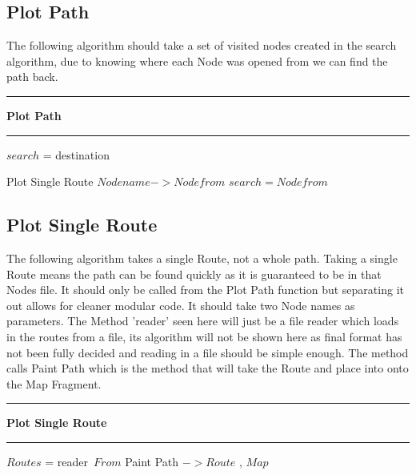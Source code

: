 \documentclass[10pt,a4paper]{article}
\begin{document}
\subsection{Plot Path}
The following algorithm should take a set of visited nodes created in the search algorithm, due to knowing where each Node was opened from we can find the path back.
\vspace{0.3cm}
\hrule
\vspace{0.1cm}
\textbf{Plot Path}
\vspace{0.1cm}
\hrule
\vspace{0.1cm}
\begin{algorithmic}[1]
\State$search$ = destination
	
		\State Plot Single Route $Node name -> Node from$
		\State $search = Node from$
	\EndIf
\EndFor
\EndFor
\end{algorithmic}
\newpage
\subsection{Plot Single Route}
The following algorithm takes a single Route, not a whole path. Taking a single Route means the path can be found quickly as it is guaranteed to be in that Nodes file. It should only be called from the Plot Path function but separating it out allows for cleaner modular code. It should take two Node names as parameters. The Method 'reader' seen here will just be a file reader which loads in the routes from a file, its algorithm will not be shown here as final format has not been fully decided and reading in a file should be simple enough. The method calls Paint Path which is the method that will take the Route and place into onto the Map Fragment.
\vspace{0.3cm}
\hrule
\vspace{0.2cm}
\textbf{Plot Single Route}
\vspace{0.1cm}
\hrule
\vspace{0.1cm}
\begin{algorithmic}[1]
\State $Routes$ = reader\ $From$
		\State Paint Path  $-> Route$ , $Map$
	\EndIf
\EndFor

\end{algorithmic}
\end{document}
